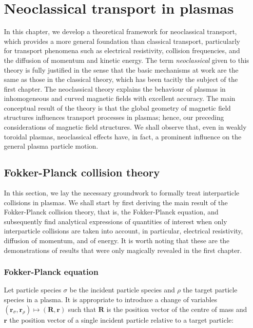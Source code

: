 \chapter{Neoclassical transport in plasmas}

In this chapter, we develop a theoretical framework for neoclassical transport, which provides a more general foundation than classical transport, particularly for transport phenomena such as electrical resistivity, collision frequencies, and the diffusion of momentum and kinetic energy. The term \textit{neoclassical} given to this theory is fully justified in the sense that the basic mechanisms at work are the same as those in the classical theory, which has been tacitly the subject of the first chapter. The neoclassical theory explains the behaviour of plasmas in inhomogeneous and curved magnetic fields with excellent accuracy. The main conceptual result of the theory is that the global geometry of magnetic field structures influences transport processes in plasmas; hence, our preceding considerations of magnetic field structures. We shall observe that, even in weakly toroidal plasmas, neoclassical effects have, in fact, a prominent influence on the general plasma particle motion.

\section{Fokker-Planck collision theory}

In this section, we lay the necessary groundwork to formally treat interparticle collisions in plasmas. We shall start by first deriving the main result of the Fokker-Planck collision theory, that is, the Fokker-Planck equation, and subsequently find analytical expressions of quantities of interest when only interparticle collisions are taken into account, in particular, electrical resistivity, diffusion of momentum, and of energy. It is worth noting that these are the demonstrations of results that were only magically revealed in the first chapter.

\label{fokker}

\subsection{Fokker-Planck equation}

Let particle species $\sigma$ be the incident particle species and $\rho$ the target particle species in a plasma. It is appropriate to introduce a change of variables $(\mathbf{r}_\sigma, \mathbf{r}_\rho)\mapsto(\mathbf{R}, \mathbf{r})$ such that $\mathbf{R}$ is the position vector of the centre of mass and $\mathbf{r}$ the position vector of a single incident particle relative to a target particle:

